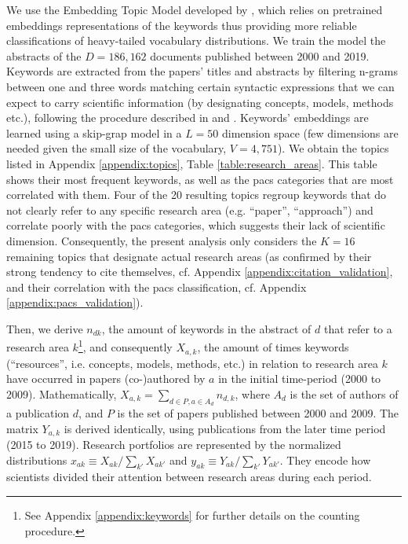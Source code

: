\documentclass{article}
\begin{document}
We use the Embedding Topic Model developed by \citealt{Dieng2020}, which relies on pretrained embeddings representations of the keywords thus providing more reliable classifications of heavy-tailed vocabulary distributions. %
We train the model the abstracts of the $D=186,162$ documents published between 2000 and 2019. Keywords are extracted from the papers' titles and abstracts by filtering n-grams between one and three words matching certain syntactic expressions that we can expect to carry scientific information (by designating concepts, models, methods etc.), following the procedure described in \citealt{Gautheron2023} and \citealt{omodei_tel-01097702}. Keywords' embeddings are learned using a skip-grap model in a $L=50$ dimension space (few dimensions are needed given the small size of the vocabulary, $V=4,751$). We obtain the topics listed in Appendix \ref{appendix:topics}, Table \ref{table:research_areas}. This table shows their most frequent keywords, as well as the \gls{pacs} categories that are most correlated with them. Four of the 20 resulting topics regroup keywords that do not clearly refer to any specific research area (e.g. ``paper'', ``approach'') and correlate poorly with the \gls{pacs} categories, which suggests their lack of scientific dimension. Consequently, the present analysis only considers the $K=16$ remaining topics that designate actual research areas (as confirmed by their strong tendency to cite themselves, cf. Appendix \ref{appendix:citation_validation}, and their correlation with the \gls{pacs} classification, cf. Appendix \ref{appendix:pacs_validation}).


Then, we derive $n_{dk}$, the amount of keywords in the abstract of $d$ that refer to a research area $k$\footnote{See Appendix \ref{appendix:keywords} for further details on the counting procedure.}, and consequently $X_{a,k}$, the amount of times keywords (``resources'', i.e. concepts, models, methods, etc.) in relation to research area $k$ have occurred in papers (co-)authored by $a$ in the initial time-period (2000 to 2009). Mathematically, $X_{a,k}=\sum_{d\in P,a\in A_d} n_{d,k}$, where $A_d$ is the set of authors of a publication $d$, and $P$ is the set of papers published between 2000 and 2009. The matrix $Y_{a,k}$ is derived identically, using publications from the later time period (2015 to 2019). Research portfolios are represented by the normalized distributions $x_{ak} \equiv X_{ak}/\sum_{k'} X_{ak'}$ and $y_{ak} \equiv Y_{ak}/\sum_{k'} Y_{ak'}$. They encode how scientists divided their attention between research areas during each period.
\end{document}
